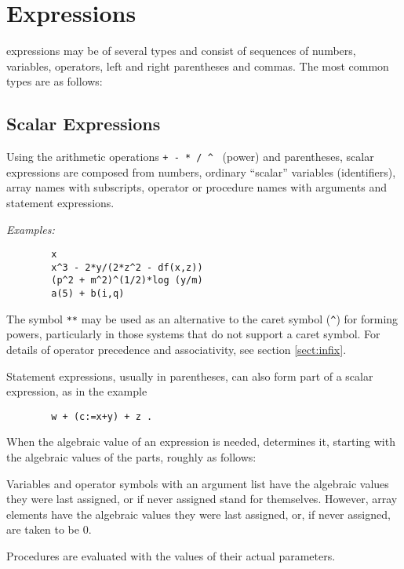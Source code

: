 \chapter{Expressions}

{\REDUCE} expressions may be of several types and consist
of sequences of numbers, variables, operators, left and right parentheses
and commas.  The most common types are as follows:

\section{Scalar Expressions}

Using the arithmetic operations \texttt{+ - * / \textasciicircum}\
%
%
%
%
%
(power) and parentheses, scalar expressions are composed from numbers,
ordinary ``scalar'' variables (identifiers), array names with subscripts,
operator or procedure names with arguments and statement expressions.

\textit{Examples:}
\begin{verbatim}
        x
        x^3 - 2*y/(2*z^2 - df(x,z))
        (p^2 + m^2)^(1/2)*log (y/m)
        a(5) + b(i,q)
\end{verbatim}
The symbol \texttt{**} may be used as an alternative to the caret symbol
\ttindextype{** (expt)}{operator}%
(\texttt{\textasciicircum})
for forming powers, particularly in those systems that do not support a
caret symbol.  For details of operator precedence and associativity,
see section \ref{sect:infix}.

Statement expressions, usually in parentheses, can also form part of
a scalar\index{Scalar} expression, as in the example
\begin{verbatim}
        w + (c:=x+y) + z .
\end{verbatim}
When the algebraic value of an expression is needed, {\REDUCE} determines it,
starting with the algebraic values of the parts, roughly as follows:

Variables and operator symbols with an argument list have the algebraic
values they were last assigned, or if never assigned stand for themselves.
However, array elements have the algebraic values they were last assigned,
or, if never assigned, are taken to be 0.

Procedures are evaluated with the values of their actual parameters.

